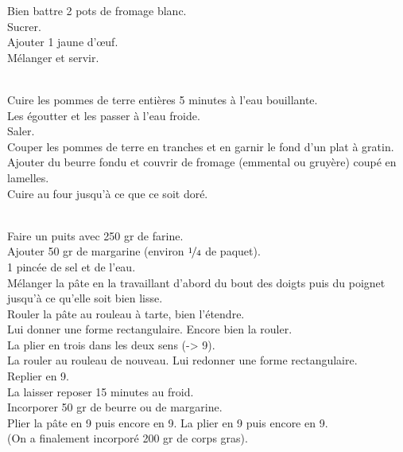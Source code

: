 \begin{minipage}[c]{\textwidth}
Bien battre 2 pots de fromage blanc.\\
Sucrer.\\
Ajouter 1 jaune d’œuf.\\
Mélanger et servir.\\
\\

\end{minipage}

\begin{minipage}[c]{\textwidth}
Cuire les pommes de terre entières 5 minutes à l’eau bouillante.\\
Les égoutter et les passer à l’eau froide. \\
Saler.\\
Couper les pommes de terre en tranches et en garnir le fond d’un plat à gratin. \\
Ajouter du beurre fondu et couvrir de fromage (emmental ou gruyère) coupé en lamelles.\\
Cuire au four jusqu’à ce que ce soit doré.\\
\\

\end{minipage}

\begin{minipage}[c]{\textwidth}
Faire un puits avec 250 gr de farine.\\
Ajouter 50 gr de margarine (environ $\nicefrac{1}{4}$ de paquet).\\
1 pincée de sel et de l’eau.\\
Mélanger la pâte en la travaillant d’abord du bout des doigts puis du poignet jusqu’à ce qu’elle soit bien lisse.\\
Rouler la pâte au rouleau à tarte, bien l’étendre.\\
Lui donner une forme rectangulaire. Encore bien la rouler. \\
La plier en trois dans les deux sens (-> 9).\\
La rouler au rouleau de nouveau. Lui redonner une forme rectangulaire.\\
Replier en 9.\\
La laisser reposer 15 minutes au froid.\\
Incorporer 50 gr de beurre ou de margarine.\\
Plier la pâte en 9 puis encore en 9. La plier en 9 puis encore en 9.\\
(On a finalement incorporé 200 gr de corps gras).\\
\\

\end{minipage}

